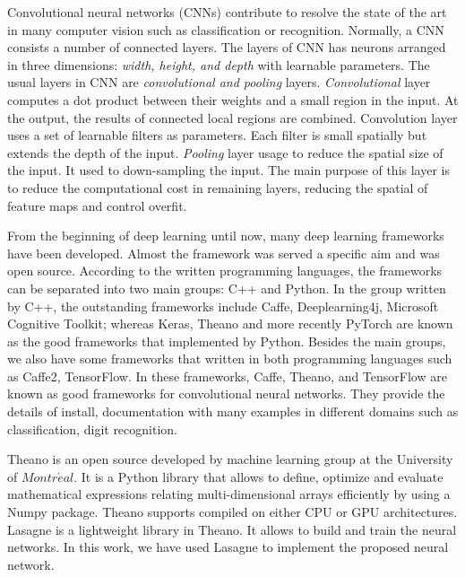 \documentclass[conference]{IEEEtran}
\begin{document}
Convolutional neural networks (CNNs) contribute to resolve the state of the art in many computer vision such as classification\cite{krizhevsky2012imagenet}\cite{ciregan2012multi} or recognition\cite{li2015convolutional}\cite{tompson2014joint}. Normally, a CNN consists a number of connected layers. The layers of CNN has neurons arranged in three dimensions: \textit{width, height, and depth} with learnable parameters. The usual layers in CNN are \textit{convolutional and pooling} layers. \textit{Convolutional} layer computes a dot product between their weights and a small region in the input. At the output, the results of connected local regions are combined. Convolution layer uses a set of learnable filters as parameters. Each filter is small spatially but extends the depth of the input. \textit{Pooling} layer usage to reduce the spatial size of the input. It used to down-sampling the input. The main purpose of this layer is to reduce the computational cost in remaining layers, reducing the spatial of feature maps and control overfit.

From the beginning of deep learning until now, many deep learning frameworks have been developed. Almost the framework was served a specific aim and was open source. According to the written programming languages, the frameworks can be separated into two main groups: C++ and Python. In the group written by C++, the outstanding frameworks include Caffe\cite{jia2014caffe}, Deeplearning4j, Microsoft Cognitive Toolkit\cite{yu2014introduction}; whereas Keras\cite{chollet2015keras}, Theano\cite{2016arXiv160502688short} and more recently PyTorch\cite{} are known as the good frameworks that implemented by Python. Besides the main groups, we also have some frameworks that written in both programming languages such as Caffe2\cite{jia2014caffe}, TensorFlow\cite{abadi2016tensorflow}. In these frameworks, Caffe, Theano, and TensorFlow are known as good frameworks for convolutional neural networks. They provide the details of install, documentation with many examples in different domains such as classification, digit recognition.

Theano is an open source developed by machine learning group at the University of $Montr\acute{e}al$. It is a Python library that allows to define, optimize and evaluate mathematical expressions relating multi-dimensional arrays efficiently by using a Numpy package. Theano supports compiled on either CPU or GPU architectures. Lasagne\cite{lasagne} is a lightweight library in Theano. It allows to build and train the neural networks. In this work, we have used Lasagne to implement the proposed neural network.
\end{document}
